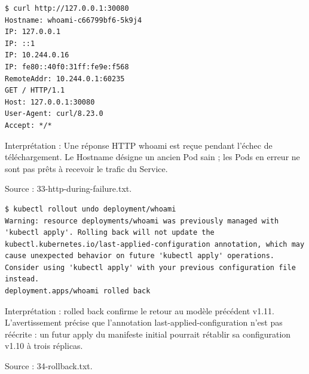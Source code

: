 \documentclass[11pt,a4paper]{article}
\begin{document}
\par\medskip\noindent\begin{minipage}{\linewidth}
\par\vspace{4pt}\noindent\begin{minipage}{\linewidth}
\begin{Verbatim}[breaklines=true,breakanywhere=true,fontsize=\footnotesize,frame=single,framesep=8pt,rulecolor=\color{teal}]
$ curl http://127.0.0.1:30080
Hostname: whoami-c66799bf6-5k9j4
IP: 127.0.0.1
IP: ::1
IP: 10.244.0.16
IP: fe80::40f0:31ff:fe9e:f568
RemoteAddr: 10.244.0.1:60235
GET / HTTP/1.1
Host: 127.0.0.1:30080
User-Agent: curl/8.23.0
Accept: */*
\end{Verbatim}
\end{minipage}\par\vspace{6pt}

Interprétation : Une réponse HTTP whoami est reçue pendant l'échec de téléchargement. Le Hostname désigne un ancien Pod sain ; les Pods en erreur ne sont pas prêts à recevoir le trafic du Service.

{\footnotesize\color{teal} Source : 33-http-during-failure.txt.\par}
\end{minipage}\par\medskip

\par\medskip\noindent\begin{minipage}{\linewidth}
\par\vspace{4pt}\noindent\begin{minipage}{\linewidth}
\begin{Verbatim}[breaklines=true,breakanywhere=true,fontsize=\footnotesize,frame=single,framesep=8pt,rulecolor=\color{teal}]
$ kubectl rollout undo deployment/whoami
Warning: resource deployments/whoami was previously managed with 'kubectl apply'. Rolling back will not update the kubectl.kubernetes.io/last-applied-configuration annotation, which may cause unexpected behavior on future 'kubectl apply' operations. Consider using 'kubectl apply' with your previous configuration file instead.
deployment.apps/whoami rolled back
\end{Verbatim}
\end{minipage}\par\vspace{6pt}

Interprétation : rolled back confirme le retour au modèle précédent v1.11. L'avertissement précise que l'annotation last-applied-configuration n'est pas réécrite : un futur apply du manifeste initial pourrait rétablir sa configuration v1.10 à trois réplicas.

{\footnotesize\color{teal} Source : 34-rollback.txt.\par}
\end{minipage}\par\medskip
\end{document}

